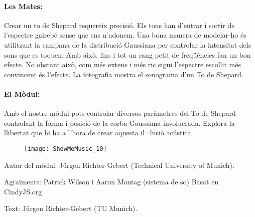 \paragraph{Les Mates:}Crear un to de Shepard requereix precisió. Els tons han d'entrar i  sortir de l'espectre gairebé sense que ens n'adonem. Una bona manera de modelar-ho és utilitzant la campana de la distribució Gaussiana per controlar la intensitat dels sons que es toquen. Amb això, fins i tot un rang petit de freqüències fan un bon efecte. No obstant això, com més extens i més ric sigui l'espectre escollit més convincent és l'efecte. La fotografia mostra el sonograma d'un To de Shepard.

\paragraph{El Mòdul:}Amb el nostre mòdul pots controlar diversos paràmetres del To de Shepard controlant la forma i posició de la corba Gaussiana involucrada. Explora la llibertat que hi ha a l'hora de crear aquesta il·lusió acústica.

\begin{figure}[h]
\centering
\texttt{[image: ShowMeMusic\_10]}
\end{figure}
\strut
\vspace{6em}

\begin{sectcredits}
\item[Autor del mòdul:] Jürgen Richter-Gebert (Technical University of Munich).

\item[Agraïments:] Patrick Wilson i Aaron Montag (sistema de so) Basat en CindyJS.org

\item[Text:] Jürgen Richter-Gebert (TU Munich).
\end{sectcredits}
